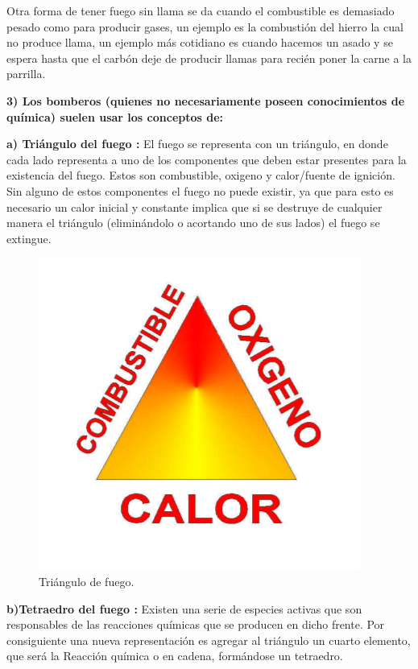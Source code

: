 \documentclass[letterpaper,11pt]{article}
\begin{document}
Otra forma de tener fuego sin llama se da cuando el combustible es demasiado pesado como para producir gases, un ejemplo es la combustión del hierro la cual no produce llama, un ejemplo más cotidiano es cuando hacemos un asado y se espera hasta que el carbón deje de producir llamas para recién poner la carne a la parrilla.

\textbf{3) Los bomberos (quienes no necesariamente poseen conocimientos de química) suelen usar los conceptos de:}

\textbf{a) Triángulo del fuego : }
El fuego se representa con un triángulo, en donde cada lado representa a uno de los componentes que deben estar presentes para la existencia del fuego. Estos son combustible, oxigeno y calor/fuente de ignición. Sin alguno de estos componentes el fuego no puede existir, ya que para esto es necesario un calor inicial y constante implica que si se destruye de cualquier manera el triángulo (eliminándolo o acortando uno de sus lados) el fuego se extingue.


\begin{figure}[H]
\centering
\includegraphics[scale=0.6]{triangulo de fuego.PNG} 
\caption{Triángulo de fuego.}
\label{fig:fig1}
\end{figure}


\textbf{b)Tetraedro del fuego : }Existen una serie de especies activas que son responsables de las reacciones químicas que se producen en dicho frente. Por consiguiente una nueva representación es agregar al triángulo un cuarto elemento, que será la Reacción química o en cadena, formándose un tetraedro.
\end{document}
